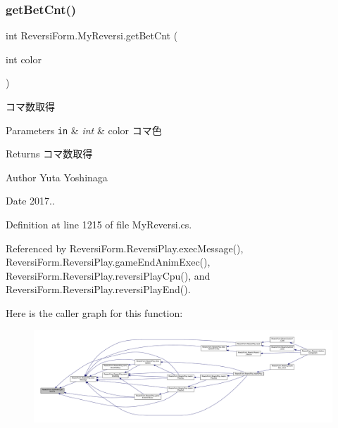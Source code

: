 \subsubsection{\texorpdfstring{get\+Bet\+Cnt()}{getBetCnt()}}
{\footnotesize\ttfamily int Reversi\+Form.\+My\+Reversi.\+get\+Bet\+Cnt (\begin{DoxyParamCaption}\item[{int}]{color }\end{DoxyParamCaption})}



コマ数取得 


\begin{DoxyParams}[1]{Parameters}
\mbox{\tt in}  & {\em int} & color コマ色 \\
\hline
\end{DoxyParams}
\begin{DoxyReturn}{Returns}
コマ数取得 
\end{DoxyReturn}
\begin{DoxyAuthor}{Author}
Yuta Yoshinaga 
\end{DoxyAuthor}
\begin{DoxyDate}{Date}
2017.. 
\end{DoxyDate}


Definition at line 1215 of file My\+Reversi.\+cs.



Referenced by Reversi\+Form.\+Reversi\+Play.\+exec\+Message(), Reversi\+Form.\+Reversi\+Play.\+game\+End\+Anim\+Exec(), Reversi\+Form.\+Reversi\+Play.\+reversi\+Play\+Cpu(), and Reversi\+Form.\+Reversi\+Play.\+reversi\+Play\+End().

Here is the caller graph for this function\+:\nopagebreak
\begin{figure}[H]
\begin{center}
\leavevmode
\includegraphics[width=350pt]{class_reversi_form_1_1_my_reversi_aa69640136727deb89addafae8e8e54cb_icgraph}
\end{center}
\end{figure}
\mbox{\label{class_reversi_form_1_1_my_reversi_a960e2691d2d106e5ad6036cfe9cf2503}} 
